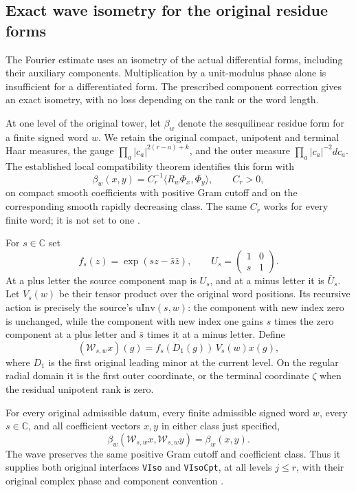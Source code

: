 \subsection{Exact wave isometry for the original residue forms}
\label{actual-residue-wave-isometry}

The Fourier estimate uses an isometry of the actual differential
forms, including their auxiliary components.  Multiplication by a
unit-modulus phase alone is insufficient for a differentiated form.
The prescribed component correction gives an exact isometry, with no
loss depending on the rank or the word length.

At one level of the original tower, let $\beta_w$ denote the
sesquilinear residue form for a finite signed word $w$.  We retain
the original compact, unipotent and terminal Haar measures, the gauge
$\prod_a|c_a|^{2(r-a)+k}$, and the outer measure
$\prod_a|c_a|^{-2}dc_a$.  The established local compatibility theorem
identifies this form with
\begin{equation}\label{wave-isometry-form}
 \beta_w(x,y)=C_r^{-1}\langle R_w\Phi_x,\Phi_y\rangle,
 \qquad C_r>0,
\end{equation}
on compact smooth coefficients with positive Gram cutoff and on the
corresponding smooth rapidly decreasing class.  The same $C_r$ works
for every finite word; it is not set to one
\cite{wave-isometry-established}.

For $s\in\mathbb C$ set
\[
 f_s(z)=\exp(sz-\bar s\bar z),\qquad
 U_s=\begin{pmatrix}1&0\\s&1\end{pmatrix}.
\]
At a plus letter the source component map is $U_s$, and at a
minus letter it is $\bar U_s$.  Let $V_s(w)$ be their tensor product
over the original word positions.  Its recursive action is precisely
the source's $\mathrm{uInv}(s,w)$: the component with new index zero
is unchanged, while the component with new index one gains $s$ times
the zero component at a plus letter and $\bar s$ times it at a
minus letter.  Define
\[
 (\mathcal W_{s,w}x)(g)
       =f_s(D_1(g))\,V_s(w)x(g),
\]
where $D_1$ is the first original leading minor at the current
level.  On the regular radial domain it is the first outer
coordinate, or the terminal coordinate $\zeta$ when the residual
unipotent rank is zero.

\begin{theorem}\label{wave-isometry-actual}
For every original admissible datum, every finite admissible signed
word $w$, every $s\in\mathbb C$, and all coefficient vectors $x,y$
in either class just specified,
\begin{equation}\label{wave-isometry-exact}
 \beta_w(\mathcal W_{s,w}x,\mathcal W_{s,w}y)=\beta_w(x,y).
\end{equation}
The wave preserves the same positive Gram cutoff and coefficient
class.  Thus it supplies both original interfaces
\texttt{VIso} and \texttt{VIsoCpt}, at all levels $j\le r$, with
their original complex phase and component convention
\cite{wave-isometry-source}.
\end{theorem}

